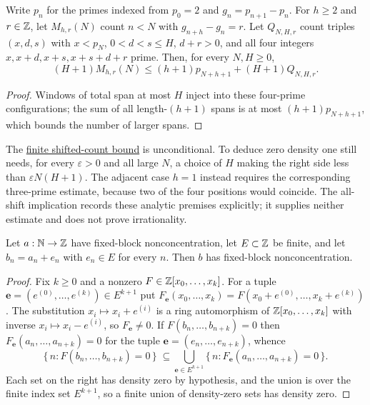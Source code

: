 \documentclass[11pt]{article}
\begin{document}
\begin{proposition}\label{long251:res:shiftedcount}
Write $p_n$ for the primes indexed from $p_0=2$ and $g_n=p_{n+1}-p_n$.
For $h\ge2$ and $r\in\mathbb{Z}$, let $M_{h,r}(N)$ count $n<N$ with $g_{n+h}-g_n=r$.
Let $Q_{N,H,r}$ count triples $(x,d,s)$ with $x<p_N$,
$0<d<s\le H$, $d+r>0$, and all four integers
$x,x+d,x+s,x+s+d+r$ prime. Then, for every $N,H\ge0$,
\[
 (H+1)M_{h,r}(N)\le
 (h+1)p_{N+h+1}+(H+1)Q_{N,H,r}.
\]
\end{proposition}

\begin{proof}
Windows of total span at most $H$ inject into these four-prime
configurations; the sum of all length-$(h+1)$ spans is at most
$(h+1)p_{N+h+1}$, which bounds the number of larger spans.
\end{proof}

The \href{https://github.com/wcook04/plectis-erdos/blob/d058b9150218ae23d2cfd975580088d6167e9da8/ErdosProblems/Erdos251/ShiftedGapCountingR9.lean#L152}{finite shifted-count bound} is unconditional.
To deduce zero density one still needs, for every $\varepsilon>0$ and all
large $N$, a choice of $H$ making the right side less than
$\varepsilon N(H+1)$. The adjacent case $h=1$ instead requires the
corresponding three-prime estimate, because two of the four positions would
coincide. The all-shift implication records these analytic premises explicitly;
it supplies neither estimate and does not prove irrationality.

\begin{theorem}\label{long251:res:nonconcentration}
Let $a:\mathbb{N}\to\mathbb{Z}$ have fixed-block nonconcentration, let $E\subset\mathbb{Z}$ be finite,
and let $b_n=a_n+e_n$ with $e_n\in E$ for every $n$.  Then $b$ has fixed-block
nonconcentration.
\end{theorem}

\begin{proof}
Fix $k\ge0$ and a nonzero $F\in\mathbb{Z}[x_0,\ldots,x_k]$.  For a tuple
$\mathbf e=(e^{(0)},\ldots,e^{(k)})\in E^{k+1}$ put
$F_{\mathbf e}(x_0,\ldots,x_k)=F(x_0+e^{(0)},\ldots,x_k+e^{(k)})$.  The
substitution $x_i\mapsto x_i+e^{(i)}$ is a ring automorphism of
$\mathbb{Z}[x_0,\ldots,x_k]$ with inverse $x_i\mapsto x_i-e^{(i)}$, so
$F_{\mathbf e}\ne0$.  If $F(b_n,\ldots,b_{n+k})=0$ then
$F_{\mathbf e}(a_n,\ldots,a_{n+k})=0$ for the tuple
$\mathbf e=(e_n,\ldots,e_{n+k})$, whence
\[
 \{\,n:F(b_n,\ldots,b_{n+k})=0\,\}
 \;\subseteq\!\!
 \bigcup_{\mathbf e\in E^{k+1}}\!\!
 \{\,n:F_{\mathbf e}(a_n,\ldots,a_{n+k})=0\,\}.
\]
Each set on the right has density zero by hypothesis, and the union is over
the finite index set $E^{k+1}$, so a finite union of density-zero sets has
density zero.
\end{proof}
\end{document}
